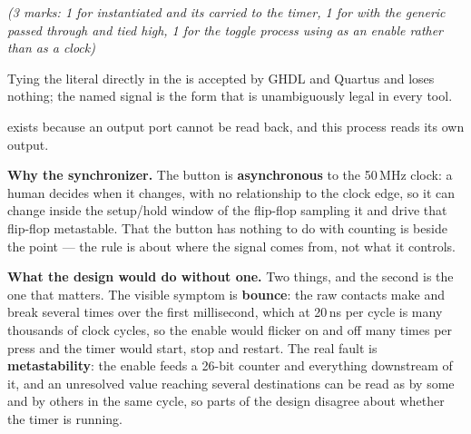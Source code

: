 {\itshape (3 marks: 1 for  instantiated and its  carried to the
timer, 1 for  with the generic passed through and  tied high, 1 for the
toggle process using  as an enable rather than as a clock)\par}

\medskip
Tying the literal  directly in the  is accepted by GHDL and Quartus and
loses nothing; the named signal is the form that is unambiguously legal in every tool.

 exists because an output port cannot be read back, and this process reads its own
output.

\textbf{Why the synchronizer.} The button is \textbf{asynchronous} to the 50\,MHz clock: a human
decides when it changes, with no relationship to the clock edge, so it can change inside the
setup/hold window of the flip-flop sampling it and drive that flip-flop metastable. That the button
has nothing to do with counting is beside the point --- the rule is about where the signal comes
from, not what it controls. 

\textbf{What the design would do without one.} Two things, and the second is the one that matters.
The visible symptom is \textbf{bounce}: the raw contacts make and break several times over the first
millisecond, which at 20\,ns per cycle is many thousands of clock cycles, so the enable would
flicker on and off many times per press and the timer would start, stop and restart. The real fault
is \textbf{metastability}: the enable feeds a 26-bit counter and everything downstream of it, and an
unresolved value reaching several destinations can be read as  by some and  by
others in the same cycle, so parts of the design disagree about whether the timer is running.


